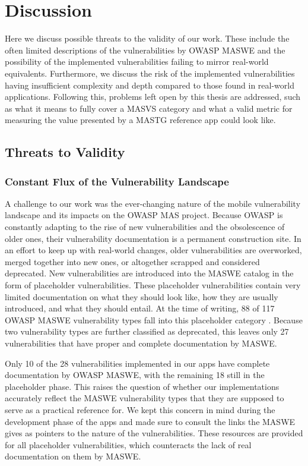 \chapter{Discussion}
\label{c:discussion}

Here we discuss possible threats to the validity of our work. These include the often limited descriptions of the vulnerabilities by OWASP MASWE and the possibility of the implemented vulnerabilities failing to mirror real-world equivalents. Furthermore, we discuss the risk of the implemented vulnerabilities having insufficient complexity and depth compared to those found in real-world applications. Following this, problems left open by this thesis are addressed, such as what it means to fully cover a MASVS category and what a valid metric for measuring the value presented by a MASTG reference app could look like.

\section{Threats to Validity}

\subsection{Constant Flux of the Vulnerability Landscape}
A challenge to our work was the ever-changing nature of the mobile vulnerability landscape and its impacts on the OWASP MAS project. Because OWASP is constantly adapting to the rise of new vulnerabilities and the obsolescence of older ones, their vulnerability documentation is a permanent construction site. In an effort to keep up with real-world changes, older vulnerabilities are overworked, merged together into new ones, or altogether scrapped and considered deprecated. New vulnerabilities are introduced into the MASWE catalog in the form of placeholder vulnerabilities. These placeholder vulnerabilities contain very limited documentation on what they should look like, how they are usually introduced, and what they should entail. At the time of writing, 88 of 117 OWASP MASWE vulnerability types fall into this placeholder category \cite{owasp_repo_vulnerability_stati}. Because two vulnerability types are further classified as deprecated, this leaves only 27 vulnerabilities that have proper and complete documentation by MASWE.

Only 10 of the 28 vulnerabilities implemented in our apps have complete documentation by OWASP MASWE, with the remaining 18 still in the placeholder phase. This raises the question of whether our implementations accurately reflect the MASWE vulnerability types that they are supposed to serve as a practical reference for. We kept this concern in mind during the development phase of the apps and made sure to consult the links the MASWE gives as pointers to the nature of the vulnerabilities. These resources are provided for all placeholder vulnerabilities, which counteracts the lack of real documentation on them by MASWE.

